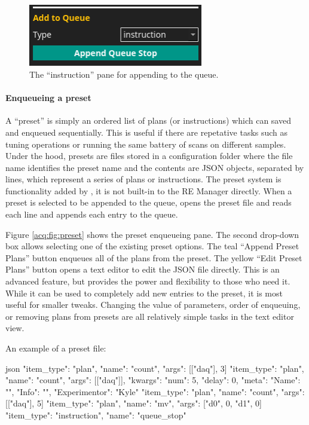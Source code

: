 \begin{figure}
\includegraphics[width=3in]{"acquisition/images/instruction"}
\caption[Instruction Pane]{
	The ``instruction'' pane for appending to the queue.
}
\label{acq:fig:instruction}
\end{figure}

\paragraph{Enqueueing a preset}

A ``preset'' is simply an ordered list of plans (or instructions) which can saved and enqueued sequentially.
This is useful if there are repetative tasks such as tuning operations or running the same battery of scans on different samples.
Under the hood, presets are files stored in a configuration folder where the file name identifies the preset name and the contents are JSON objects, separated by lines, which represent a series of plans or instructions.
The preset system is functionality added by \blueskycmds, it is not built-in to the RE Manager directly.
When a preset is selected to be appended to the queue, \blueskycmds opens the preset file and reads each line and appends each entry to the queue.

Figure \ref{acq:fig:preset} shows the preset enqueueing pane.
The second drop-down box allows selecting one of the existing preset options.
The teal ``Append Preset Plans'' button enqueues all of the plans from the preset.
The yellow ``Edit Preset Plans'' button opens a text editor to edit the JSON file directly.
This is an advanced feature, but provides the power and flexibility to those who need it.
While it can be used to completely add new entries to the preset, it is most useful for smaller tweaks.
Changing the value of parameters, order of enqueuing, or removing plans from presets are all relatively simple tasks in the text editor view.

An example of a preset file:

\begin{codefragment}{json}
\noop
{"item_type": "plan", "name": "count", "args": [["daq"], 3]}
{"item_type": "plan", "name": "count", "args": [["daq"]], "kwargs": {"num": 5, "delay": 0}, "meta": {"Name": "", "Info": "", "Experimentor": "Kyle"}}
{"item_type": "plan", "name": "count", "args": [["daq"], 5]}
{"item_type": "plan", "name": "mv", "args": ["d0", 0, "d1", 0]}
{"item_type": "instruction", "name": "queue_stop"}

\end{codefragment}

